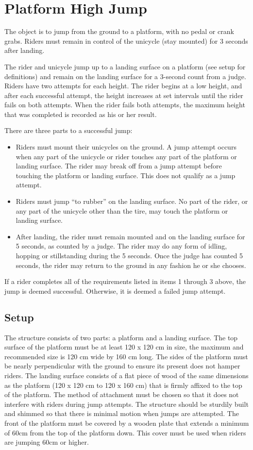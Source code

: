 \section{Platform High Jump}
The object is to jump from the ground to a platform, with no pedal or crank grabs.
Riders must remain in control of the unicycle (stay mounted) for 3 seconds after landing.

The rider and unicycle jump up to a landing surface on a platform (see setup for definitions) and remain on the landing surface for a 3-second count from a judge.
Riders have two attempts for each height.
The rider begins at a low height, and after each successful attempt, the height increases at set intervals until the rider fails on both attempts.
When the rider fails both attempts, the maximum height that was completed is recorded as his or her result.

There are three parts to a successful jump:
\begin{itemize}
\item Riders must mount their unicycles on the ground.
A jump attempt occurs when any part of the unicycle or rider touches any part of the platform or landing surface.
The rider may break off from a jump attempt before touching the platform or landing surface.
This does not qualify as a jump attempt.
\item Riders must jump ``to rubber'' on the landing surface.
No part of the rider, or any part of the unicycle other than the tire, may touch the platform or landing surface.
\item After landing, the rider must remain mounted and on the landing surface for 5 seconds, as counted by a judge.
The rider may do any form of idling, hopping or stillstanding during the 5 seconds.
Once the judge has counted 5 seconds, the rider may return to the ground in any fashion he or she chooses.
\end{itemize}
If a rider completes all of the requirements listed in items 1 through 3 above, the jump is deemed successful.
Otherwise, it is deemed a failed jump attempt.

\subsection{Setup}
The structure consists of two parts: a platform and a landing surface.
The top surface of the platform must be at least 120 x 120 cm in size, the maximum and recommended size is 120 cm wide by 160 cm long.
The sides of the platform must be nearly perpendicular with the ground to ensure its present does not hamper riders.
The landing surface consists of a flat piece of wood of the same dimensions as the platform (120 x 120 cm to 120 x 160 cm) that is firmly affixed to the top of the platform.
The method of attachment must be chosen so that it does not interfere with riders during jump attempts.
The structure should be sturdily built and shimmed so that there is minimal motion when jumps are attempted.
The front of the platform must be covered by a wooden plate that extends a minimum of 60cm from the top of the platform down.
This cover must be used when riders are jumping 60cm or higher.

